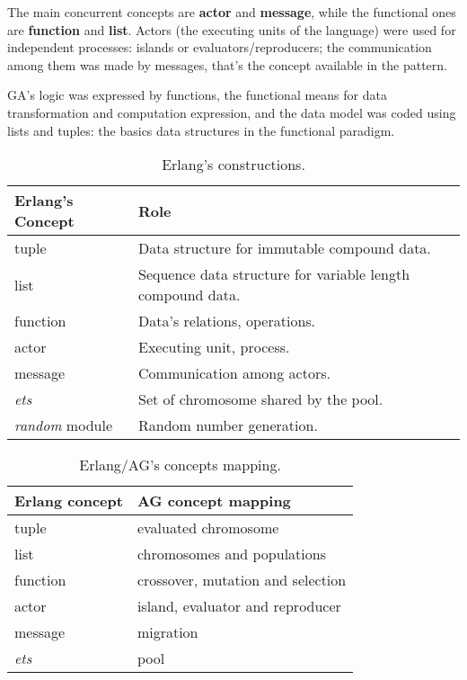 
The main concurrent concepts are \textbf{actor} and \textbf{message}, while the functional ones are \textbf{function} and \textbf{list}. Actors (the executing units of the language) were used for independent processes: islands or evaluators/reproducers; the communication among them was made by messages, that’s the concept available in the pattern.

GA’s logic was expressed by functions, the functional means for data transformation and computation expression, and the data model was coded using lists and tuples: the basics data structures in the functional paradigm.



\begin{table}[h!]
  \centering
   \caption{Erlang's constructions.}\label{erlConstructions}
\begin{tabular}{|>{\centering}p{3.4cm}|p{7cm}|}
  \hline
  \textbf{Erlang's Concept} & \textbf{Role} \tabularnewline
     \hline
  tuple & Data structure for immutable compound data. \tabularnewline
     \hline
  list & Sequence data structure for variable length compound data. \tabularnewline
     \hline
  function & Data's relations, operations. \tabularnewline
     \hline
  actor & Executing unit, process. \tabularnewline
     \hline
  message & Communication among actors. \tabularnewline
     \hline
  {\em ets} & Set of chromosome shared by the pool. \tabularnewline
     \hline
  {\em random} module& Random number generation. \tabularnewline
  \hline
\end{tabular}

\end{table}

\begin{table}
  \centering
  \caption{Erlang/AG's concepts mapping.}\label{erlAGRelation}
\begin{tabular}{|>{\centering}p{3cm}|p{6cm}|}
  \hline
  \textbf{Erlang concept} & \textbf{AG concept mapping} \tabularnewline
     \hline
  tuple & evaluated chromosome \tabularnewline
     \hline
  list & chromosomes and populations \tabularnewline
     \hline
  function & crossover, mutation and selection \tabularnewline
     \hline
  actor  & island, evaluator and reproducer \tabularnewline
     \hline
  message & migration \tabularnewline
     \hline
  {\em ets}  & pool \tabularnewline
     \hline

\end{tabular}

\end{table}


